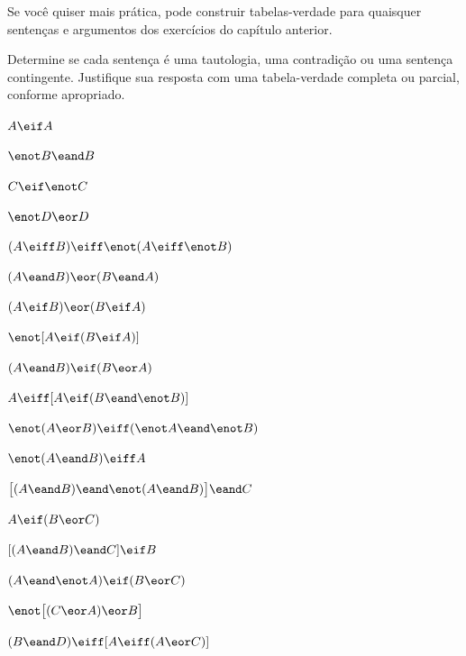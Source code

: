  








\practiceproblems
Se você quiser mais prática, pode construir tabelas-verdade para quaisquer sentenças e argumentos dos exercícios do capítulo anterior.

\solutions
\problempart
\label{pr.TT.TTorC}
Determine se cada sentença é uma tautologia, uma contradição ou uma sentença contingente. Justifique sua resposta com uma tabela-verdade completa ou parcial, conforme apropriado.
\begin{earg}
\item $A \eif A$ %
\item $\enot B \eand B$ %
\item $C \eif\enot C$ %
\item $\enot D \eor D$ %
\item $(A \eiff B) \eiff \enot(A\eiff \enot B)$ %
\item $(A\eand B) \eor (B\eand A)$ %
\item $(A \eif B) \eor (B \eif A)$ %
\item $\enot[A \eif (B \eif A)]$ %
\item $(A \eand B) \eif (B \eor A)$  %
\item $A \eiff [A \eif (B \eand \enot B)]$ %
\item $\enot(A \eor B) \eiff (\enot A \eand \enot B)$ %
\item $\enot(A\eand B) \eiff A$ %
\item $\bigl[(A\eand B) \eand\enot(A\eand B)\bigr] \eand C$ %
\item $A\eif(B\eor C)$ %
\item $[(A \eand B) \eand C] \eif B$ %
\item $(A \eand\enot A) \eif (B \eor C)$ %
\item $\enot\bigl[(C\eor A) \eor B\bigr]$ %
\item $(B\eand D) \eiff [A \eiff(A \eor C)]$%
\end{earg}


